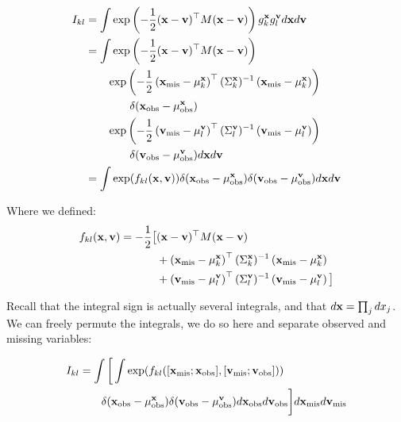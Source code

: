 \documentclass[letterpaper]{article}
\newcommand{\tp}{\top}
\newcommand{\vx}{{\bf x}}
\newcommand{\vv}{{\bf v}}
\begin{document}
\begin{equation*}
\begin{aligned}
I_{kl} &= \int \exp\left(-\frac{1}{2}(\vx-\vv)^\tp M (\vx-\vv)\right) g_k^\vx g_l^\vv d\vx
d\vv \\
&= \int \exp\left(-\frac{1}{2}(\vx-\vv)^\tp M (\vx-\vv)\right) \\
&\hspace{2em}\exp\left(-\frac{1}{2}\left(\vx_\text{mis} -
    \mu_k^\vx\right)^\tp(\Sigma_k^\vx)^{-1}\left(\vx_\text{mis} - \mu_k^\vx\right)\right) \\
& \hspace{4em} \delta(\vx_\text{obs}-\mu^\vx_\text{obs}) \\
&\hspace{2em}\exp\left(-\frac{1}{2}\left(\vv_\text{mis} -
    \mu_l^\vv\right)^\tp(\Sigma_l^\vv)^{-1}\left(\vv_\text{mis} - \mu_l^\vv\right)\right)\\
&\hspace{4em} \delta(\vv_\text{obs}-\mu^\vv_\text{obs})
d\vx d\vv \\
&= \int \exp( f_{kl}(\vx, \vv) ) \delta(\vx_\text{obs}-\mu^\vx_\text{obs}) \delta(\vv_\text{obs}-\mu^\vv_\text{obs}) d\vx d\vv
\end{aligned}
\end{equation*}

Where we defined:
\begin{equation*}
\begin{aligned}
  f_{kl}(\vx, \vv) = -\frac{1}{2}\big[ &(\vx-\vv)^\tp M (\vx-\vv) \\
&+ \left(\vx_\text{mis} - \mu_k^\vx\right)^\tp(\Sigma_k^\vx)^{-1}\left(\vx_\text{mis} - \mu_k^\vx\right) \\
&+ \left(\vv_\text{mis} - \mu_l^\vv\right)^\tp(\Sigma_l^\vv)^{-1}\left(\vv_\text{mis} - \mu_l^\vv\right) \big]
\end{aligned}
\end{equation*}

Recall that the integral sign is actually several integrals, and that $d\vx =
\prod_j dx_j$. We can freely permute the integrals, we do so here and separate
observed and missing variables:

\begin{equation*}
  \begin{aligned}
    I_{kl} &= \int \bigg[ \int \exp( f_{kl}([\vx_\text{mis}; \vx_\text{obs}], [\vv_\text{mis}; \vv_\text{obs}]) ) \\
    & \hspace{2em} \delta(\vx_\text{obs}-\mu^\vx_\text{obs}) \delta(\vv_\text{obs}-\mu^\vv_\text{obs}) d\vx_\text{obs} d\vv_\text{obs} \bigg] d\vx_\text{mis}d\vv_\text{mis}
  \end{aligned}
\end{equation*}
\end{document}
